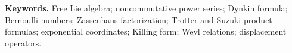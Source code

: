 \documentclass[11pt,a4paper]{article}
\numberwithin{equation}{section}
\theoremstyle{definition}
\theoremstyle{remark}
\begin{document}
\vspace{0.5em}
\noindent\textbf{Keywords.} Free Lie algebra; noncommutative power series;
Dynkin formula; Bernoulli numbers; Zassenhaus factorization; Trotter and
Suzuki product formulas; exponential coordinates; Killing form; Weyl relations;
displacement operators.
\begingroup
\small
\setlength{\parskip}{0pt}
\tableofcontents
\endgroup
\newpage














\appendix


\FloatBarrier



\end{document}
